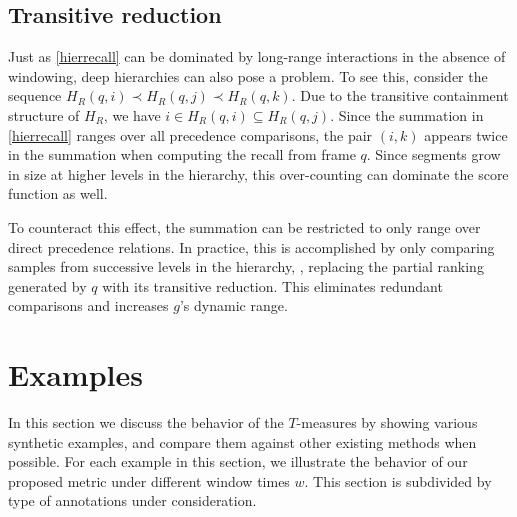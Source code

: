 \documentclass{article}
\begin{document}


\subsection{Transitive reduction}

Just as \cref{hierrecall} can be dominated by long-range interactions in the absence of windowing, deep hierarchies can also pose a problem.
To see this, consider the sequence $H_R(q, i) \prec H_R(q, j) \prec H_R(q, k)$.
Due to the transitive containment structure of $H_R$, we have $i \in H_R(q, i) \subseteq H_R(q, j)$.
Since the summation in \cref{hierrecall} ranges over all precedence comparisons, the pair $(i, k)$ appears twice in the summation when computing the
recall from frame $q$.  Since segments grow in size at higher levels in the hierarchy, this over-counting can dominate the score function as well.

To counteract this effect, the summation can be restricted to only range over direct precedence relations.
In practice, this is accomplished by only comparing samples from successive levels in the hierarchy, \ie, 
replacing the partial ranking generated by $q$ with its transitive reduction.
This eliminates redundant comparisons and increases $g$'s dynamic range.


\section{Examples}\label{sec:examples}

In this section we discuss the behavior of the $T$-measures by showing various synthetic examples, and compare them against other existing methods when possible.
For each example in this section, we illustrate the behavior of our proposed metric under different window times $w$.
This section is subdivided by type of annotations under consideration.
\end{document}
